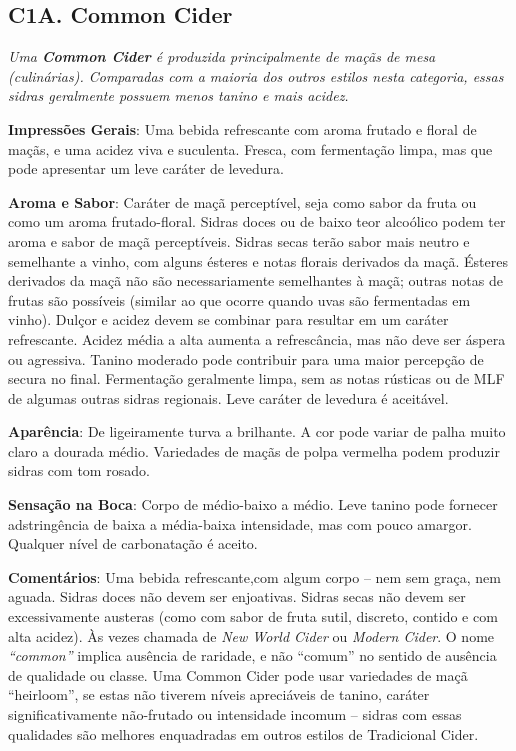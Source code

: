 \subsection*{C1A. Common Cider}

\textit{Uma \textbf{Common Cider} é produzida principalmente de maçãs de mesa (culinárias). Comparadas com a maioria dos outros estilos nesta categoria, essas sidras geralmente possuem menos tanino e mais acidez.}

\textbf{Impressões Gerais}: Uma bebida refrescante com aroma frutado e floral de maçãs, e uma acidez viva e suculenta. Fresca, com fermentação limpa, mas que pode apresentar um leve caráter de levedura.

\textbf{Aroma e Sabor}: Caráter de maçã perceptível, seja como sabor da fruta ou como um aroma frutado-floral. Sidras doces ou de baixo teor alcoólico podem ter aroma e sabor de maçã perceptíveis. Sidras secas terão sabor mais neutro e semelhante a vinho, com alguns ésteres e notas florais derivados da maçã. Ésteres derivados da maçã não são necessariamente semelhantes à maçã; outras notas de frutas são possíveis (similar ao que ocorre quando uvas são fermentadas em vinho). Dulçor e acidez devem se combinar para resultar em um caráter refrescante. Acidez média a alta aumenta a refrescância, mas não deve ser áspera ou agressiva. Tanino moderado pode contribuir para uma maior percepção de secura no final. Fermentação geralmente limpa, sem as notas rústicas ou de MLF de algumas outras sidras regionais. Leve caráter de levedura é aceitável.

\textbf{Aparência}: De ligeiramente turva a brilhante. A cor pode variar de palha muito claro a dourada médio. Variedades de maçãs de polpa vermelha podem produzir sidras com tom rosado.

\textbf{Sensação na Boca}: Corpo de médio-baixo a médio. Leve tanino pode fornecer adstringência de baixa a média-baixa intensidade, mas com pouco amargor. Qualquer nível de carbonatação é aceito.

\textbf{Comentários}: Uma bebida refrescante,com algum corpo – nem sem graça, nem aguada. Sidras doces não devem ser enjoativas. Sidras secas não devem ser excessivamente austeras (como com sabor de fruta sutil, discreto, contido e com alta acidez). Às vezes chamada de \textit{New World Cider} ou \textit{Modern Cider}. O nome \textit{“common”} implica ausência de raridade, e não “comum” no sentido de ausência de qualidade ou classe. Uma Common Cider pode usar variedades de maçã “heirloom”, se estas não tiverem níveis apreciáveis de tanino, caráter significativamente não-frutado ou intensidade incomum – sidras com essas qualidades são melhores enquadradas em outros estilos de Tradicional Cider.

